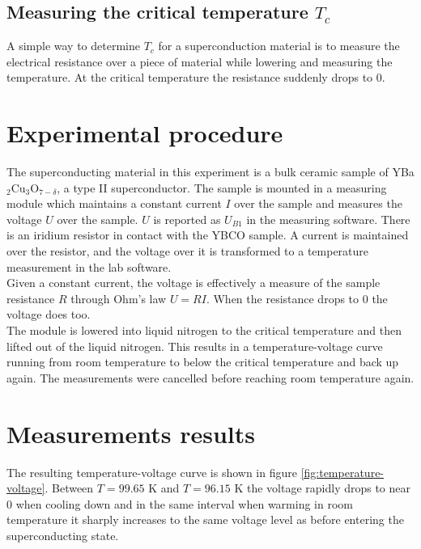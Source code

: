 \documentclass[a4paper,twoside=false,abstract=false,numbers=noenddot,
titlepage=false,headings=small,parskip=half,version=last]{scrartcl}
\begin{document}

\subsection{Measuring the critical temperature $T_c$}
A simple way to determine $T_c$ for a superconduction material is to measure the electrical resistance over a piece of material while lowering and measuring the temperature.
At the critical temperature the resistance suddenly drops to $0$.

\section{Experimental procedure}
The superconducting material in this experiment is a bulk ceramic sample of YBa$_2$Cu$_3$O$_{7-\delta}$, a type II superconductor.
The sample is mounted in a measuring module which maintains a constant current $I$ over the sample and measures the voltage $U$ over the sample. $U$ is reported as $U_{B1}$ in the measuring software. There is an iridium resistor in contact with the YBCO sample. A current is maintained over the resistor, and the voltage over it is transformed to a temperature measurement in the lab software.\\
Given a constant current, the voltage is effectively a measure of the sample resistance $R$ through Ohm's law $U=RI$. When the resistance drops to 0 the voltage does too.\\
The module is lowered into liquid nitrogen to the critical temperature and then lifted out of the liquid nitrogen.
This results in a temperature-voltage curve running from room temperature to below the critical temperature and back up again. The measurements were cancelled before reaching room temperature again.

\section{Measurements results}
The resulting temperature-voltage curve is shown in figure \ref{fig:temperature-voltage}. Between $T = 99.65$ K and $T = 96.15$ K the voltage rapidly drops to near 0 when cooling down and in the same interval when warming in room temperature it sharply increases to the same voltage level as before entering the superconducting state.
\end{document}
